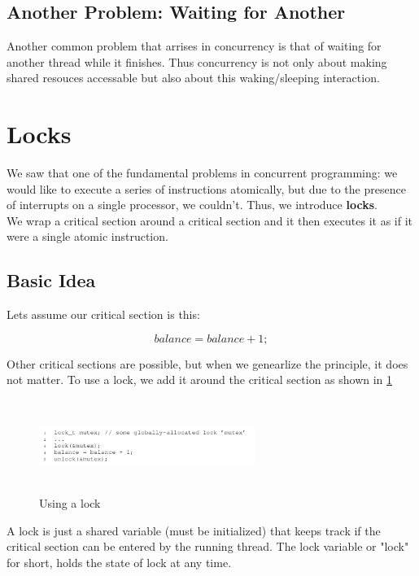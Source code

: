 \subsection{Another Problem: Waiting for Another}

Another common problem that arrises in concurrency is that of waiting for
another thread while it finishes. Thus concurrency is not only about making
shared resouces accessable but also about this waking/sleeping interaction.

\section{Locks}

We saw that one of the fundamental problems in concurrent programming: we would
like to execute a series of instructions atomically, but due to the presence of
interrupts on a single processor, we couldn't. Thus, we introduce \textbf{locks}.\\

We wrap a critical section around a critical section and it then executes it
as if it were a single atomic instruction.\\

\subsection{Basic Idea}

Lets assume our critical section is this:

$$
balance = balance + 1;
$$

Other critical sections are possible, but when we genearlize the principle, it
does not matter. To use a lock, we add it around the critical section as shown
in \ref{lockinit}

\begin{figure}[h!]
    \label{lockinit}
    \begin{center}
        \includegraphics[width=7cm, height=3cm]{img/lockinit.png}
        \caption{Using a lock}
    \end{center}
\end{figure}

A lock is just a shared variable (must be initialized) that keeps track
if the critical section can be entered by the running thread. The lock variable
or "lock" for short, holds the state of lock at any time.\\


